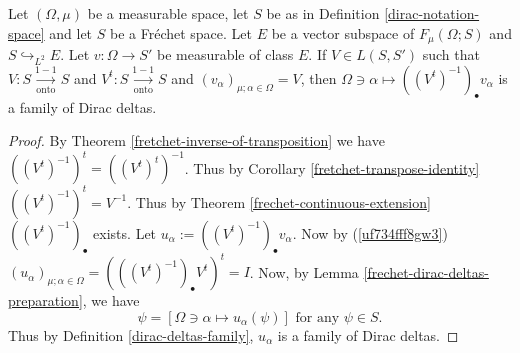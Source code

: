 \documentclass[main.tex]{subfiles}
\begin{document}
\begin{corollary}
Let $(\Omega, \mu)$ be a measurable space, let $S$ be as in Definition \ref{dirac-notation-space} and let $S$ be a Fr\'echet space. Let $E$ be a vector subspace of $F_\mu(\Omega; S)$ and $S\hookrightarrow_{L^2} E$. Let $v:\Omega\to S'$ be measurable of class $E$.
If $V\in L(S, S')$ such that $V: S \underset{\text{onto}}{\overset{1-1}{\to}} S$ and $V^t: S \underset{\text{onto}}{\overset{1-1}{\to}} S$ and $(v_\alpha)_{\mu;\alpha\in \Omega} = V$, then $\Omega\ni\alpha\mapsto((V^t)^{-1})_\bullet v_\alpha$ is a family of Dirac deltas. 
\end{corollary}
\begin{proof}
By Theorem \ref{fretchet-inverse-of-transposition} we have $((V^t)^{-1})^t = ((V^t)^t)^{-1}$. Thus by Corollary \ref{fretchet-transpose-identity} $((V^t)^{-1})^t = V^{-1}$. Thus by Theorem \ref{frechet-continuous-extension} $((V^t)^{-1})_\bullet$ exists. Let $u_\alpha := ((V^t)^{-1})_\bullet v_\alpha$. Now by (\ref{uf734fff8gw3}) $(u_\alpha)_{\mu;\alpha\in \Omega} = (((V^t)^{-1})_\bullet V^t)^t = I$.  Now, by 
Lemma \ref{frechet-dirac-deltas-preparation}, we have
\begin{equation}
\psi = [\Omega\ni\alpha\mapsto u_\alpha(\psi)] \text{ for any } \psi\in S.
\end{equation}
Thus by Definition \ref{dirac-deltas-family}, $u_\alpha$ is a family of Dirac deltas. 
\end{proof}

\end{document}

